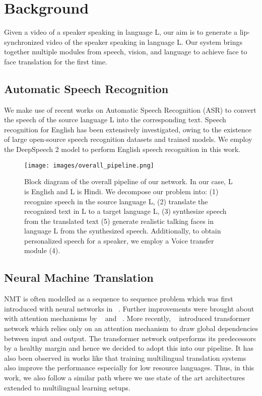 \documentclass[sigconf]{acmart}
\begin{document}
\section{Background}

\label{section:background}
Given a video of a speaker speaking in language L, our aim is to generate a lip-synchronized video of the speaker speaking in language L. Our system brings together multiple modules from speech, vision, and language to achieve face to face translation for the first time. 

\subsection{Automatic Speech Recognition}
We make use of recent works on Automatic Speech Recognition (ASR)\cite{amodei2016deep} to convert the speech of the source language L into the corresponding text. Speech recognition for English has been extensively investigated, owing to the existence of large open-source speech recognition datasets\cite{panayotov2015librispeech,rousseau2012ted} and trained models\cite{amodei2016deep}. We employ the DeepSpeech 2 model to perform English speech recognition in this work.

\begin{figure*}[h]
  \texttt{[image: images/overall\_pipeline.png]}
  \caption{Block diagram of the overall pipeline of our network. In our case, L is English and L is Hindi. We decompose our problem into: (1) recognize speech in the source language L, (2) translate the recognized text in L to a target language L, (3) synthesize speech from the translated text (5) generate realistic talking faces in language L from the synthesized speech. Additionally, to obtain personalized speech for a speaker, we employ a Voice transfer module (4).}
  \label{fig:overallpipeline}
\end{figure*}

\subsection{Neural Machine Translation}
NMT is often modelled as a sequence to sequence problem which was first introduced with neural networks in ~\citet{sutskever2014sequence}. Further improvements were brought about with attention mechanisms by ~\citet{bahdanau2014neural} and ~\citet{luong2015effective}. More recently, ~\citet{vaswani2017attention} introduced transformer network which relies only on an attention mechanism to draw global dependencies between input and output. The transformer network outperforms its predecessors by a healthy margin and hence we decided to adopt this into our pipeline. It has also been observed in works like \citet{johnson2017google} that training multilingual translation systems also improve the performance especially for low resource languages. Thus, in this work, we also follow a similar path where we use state of the art architectures extended to multilingual learning setups. 
\end{document}
